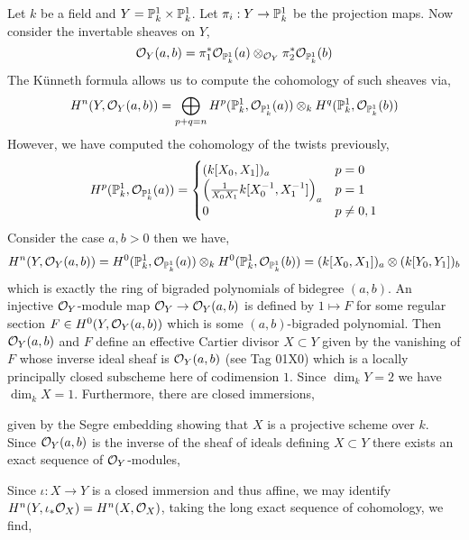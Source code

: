 \documentclass[12pt]{article}
\begin{document}
Let $k$ be a field and $Y = \P^1_k \times \P^1_k$. Let $\pi_i : Y \to \P^1_k$ be the projection maps. Now consider the invertable sheaves on $Y$,
\[ \struct{Y}(a,b) = \pi_1^* \struct{\P^1_k}(a) \otimes_{\struct{Y}} \pi_2^* \struct{\P^1_k}(b) \]
The K\"{u}nneth formula allows us to compute the cohomology of such sheaves via,
\[ H^n(Y, \struct{Y}(a,b)) = \bigoplus_{p + q = n} H^p(\P^1_k, \struct{\P^1_k}(a)) \otimes_k H^q(\P^1_k, \struct{\P^1_k}(b)) \]
However, we have computed the cohomology of the twists previously,
\[ H^p(\P^1_k, \struct{\P^1_k}(a)) = 
\begin{cases}
(k[X_0, X_1])_a & p = 0
\\
\left( \frac{1}{X_0 X_1} k[X_0^{-1}, X_1^{-1}] \right)_{a} & p = 1
\\
0 & p \neq 0,1
\end{cases} \]
Consider the case $a,b > 0$ then we have,
\[ H^n(Y, \struct{Y}(a,b)) = H^0(\P^1_k, \struct{\P^1_k}(a)) \otimes_k H^0(\P^1_k, \struct{\P^1_k}(b)) = (k[X_0, X_1])_a \otimes (k[Y_0, Y_1])_b \]
which is exactly the ring of bigraded polynomials of bidegree $(a, b)$. 
An injective $\struct{Y}$-module map $\struct{Y} \to \struct{Y}(a,b)$ is defined by $1 \mapsto F$ for some regular section $F \in H^0(Y, \struct{Y}(a,b))$ which is some $(a,b)$-bigraded polynomial. Then $\struct{Y}(a,b)$ and $F$ define an effective Cartier divisor $X \subset Y$ given by the vanishing of $F$ whose inverse ideal sheaf is $\struct{Y}(a,b)$ (see Tag 01X0) which is a locally principally closed subscheme here of codimension $1$. Since $\dim_k{Y} = 2$ we have $\dim_k{X} = 1$. Furthermore, there are closed immersions,
\begin{center}
\end{center}
given by the Segre embedding showing that $X$ is a projective scheme over $k$. Since $\struct{Y}(a,b)$ is the inverse of the sheaf of ideals defining $X \subset Y$ there exists an exact sequence of $\struct{Y}$-modules,
\begin{center}
\end{center}
Since $\iota : X \to Y$ is a closed immersion and thus affine, we may identify $H^n(Y, \iota_* \struct{X}) = H^n(X, \struct{X})$, taking the long exact sequence of cohomology, we find,
\end{document}
